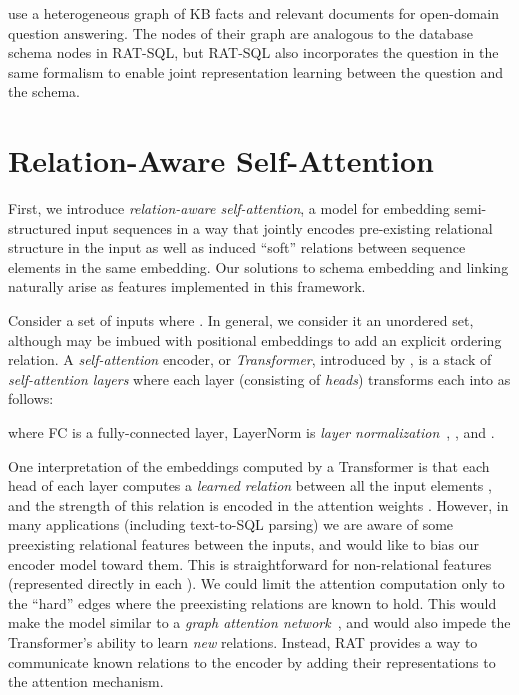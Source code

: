 \documentclass[11pt,a4paper,final]{article}
\begin{document}
\citet{sun-etal-2018-open} use a heterogeneous graph of KB facts and relevant documents for open-domain question answering.
The nodes of their graph are analogous to the database schema nodes in RAT-SQL, but RAT-SQL also incorporates the question in the same formalism to enable joint representation learning between the question and the schema.




 \section{Relation-Aware Self-Attention}\label{sec:rat}

First, we introduce \emph{relation-aware self-attention}, a model for embedding semi-structured input sequences in a way
that jointly encodes pre-existing relational structure in the input as well as induced ``soft'' relations between
sequence elements in the same embedding.
Our solutions to schema embedding and linking naturally arise as features implemented in this framework.


Consider a set of inputs  where .
In general, we consider it an unordered set, although  may be imbued with positional embeddings to add an
explicit ordering relation.
A \emph{self-attention} encoder, or \emph{Transformer}, introduced by \citet{vaswaniAttentionAllYou2017}, is a stack of
\emph{self-attention layers} where each layer (consisting of  \emph{heads}) transforms each  into
 as follows:

where FC is a fully-connected layer, LayerNorm is \emph{layer normalization}~\citep{baLayerNormalization2016},
\mbox{}, and \mbox{}.

One interpretation of the embeddings computed by a Transformer is that each head of each layer computes a
\emph{learned relation} between all the input elements , and the strength of this relation is encoded in the
attention weights .
However, in many applications (including text-to-SQL parsing) we are aware of some preexisting relational
features between the inputs, and would like to bias our encoder model toward them.
This is straightforward for non-relational features (represented directly in each ).
We could limit the attention computation only to the ``hard'' edges where the preexisting relations are known to hold.
This would make the model similar to a \emph{graph attention network}~\citep{velickovic2018graph}, and would also
impede the Transformer's ability to learn \emph{new} relations.
Instead, RAT provides a way to communicate known relations to the encoder by adding their representations
to the attention mechanism.
\end{document}
